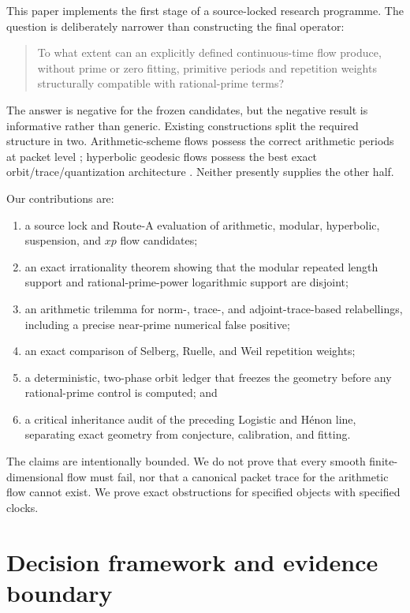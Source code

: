 \documentclass[11pt]{article}
\theoremstyle{definition}
\theoremstyle{remark}
\begin{document}
This paper implements the first stage of a source-locked research programme.
The question is deliberately narrower than constructing the final operator:

\begin{quote}
To what extent can an explicitly defined continuous-time flow produce,
without prime or zero fitting, primitive periods and repetition weights
structurally compatible with rational-prime terms?
\end{quote}

The answer is negative for the frozen candidates, but the negative result is
informative rather than generic.  Existing constructions split the required
structure in two.  Arithmetic-scheme flows possess the correct arithmetic
periods at packet level \citep{Deninger2026,Deninger2023}; hyperbolic geodesic
flows possess the best exact orbit/trace/quantization architecture
\citep{Selberg1956,Hejhal1983,PohlZagier2020}.  Neither presently supplies the
other half.

Our contributions are:
\begin{enumerate}[leftmargin=*,itemsep=2pt]
  \item a source lock and Route-A evaluation of arithmetic, modular,
  hyperbolic, suspension, and \(xp\) flow candidates;
  \item an exact irrationality theorem showing that the modular repeated
  length support and rational-prime-power logarithmic support are disjoint;
  \item an arithmetic trilemma for norm-, trace-, and adjoint-trace-based
  relabellings, including a precise near-prime numerical false positive;
  \item an exact comparison of Selberg, Ruelle, and Weil repetition weights;
  \item a deterministic, two-phase orbit ledger that freezes the geometry
  before any rational-prime control is computed; and
  \item a critical inheritance audit of the preceding Logistic and H\'enon
  line, separating exact geometry from conjecture, calibration, and fitting.
\end{enumerate}

The claims are intentionally bounded.  We do not prove that every smooth
finite-dimensional flow must fail, nor that a canonical packet trace for the
arithmetic flow cannot exist.  We prove exact obstructions for specified
objects with specified clocks.

\section{Decision framework and evidence boundary}
\end{document}
